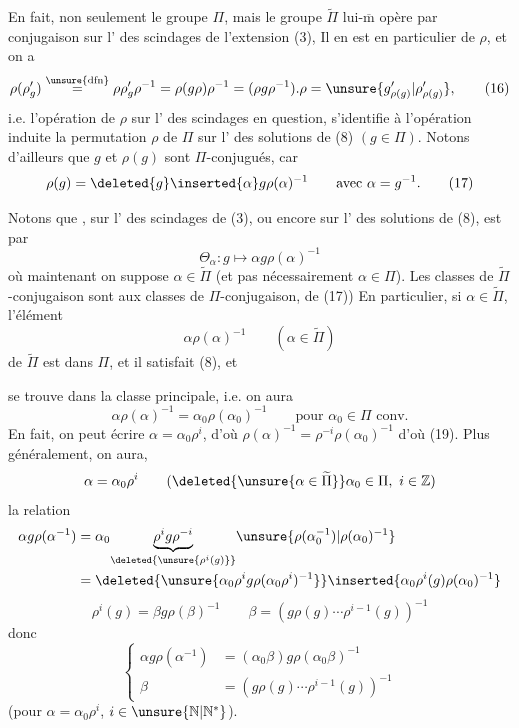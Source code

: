 En fait, non seulement le groupe $\Pi$, mais le groupe $\widetilde\Pi$ lui-$\overline{\mathrm m}$ opère par conjugaison sur l' des scindages de l'extension (3), Il en est en particulier  de $\rho$, et on a
\[
\rho(\rho'_g)\overset{\unsure{\mathrm{dfn}}}{=}
\rho\rho'_g\rho^{-1}=\rho(g\rho)\rho^{-1}
=(\rho g\rho^{-1}).\rho=\unsure{g'_{\rho(g)}|\rho'_{\rho(g)}}, \tag{16}
\]
i.e. l'opération de $\rho$ sur l' des scindages en question, s'identifie à l'opération  induite  la permutation $\rho$ de $\Pi$ sur l' des solutions de (8) $(g\in\Pi)$. Notons d'ailleurs que $g$ et $\rho(g)$  sont $\Pi$-conjugués, car
\[
\rho(g)=\deleted{g}\inserted{\alpha}g\rho(\alpha)^{-1}\qquad\text{avec }\alpha=g^{-1}. \tag{17}
\]

Notons que \deleted{\unsure{$\rho$}}, sur l' des scindages de (3), ou encore sur l' des solutions de (8), est   par
\[
\Theta_\alpha:g\longmapsto\alpha g\rho(\alpha)^{-1} \tag{10}
\]
où maintenant on suppose $\alpha\in\widetilde\Pi$ (et pas nécessairement $\alpha\in\Pi$). Les classes de $\widetilde\Pi$-conjugaison sont  aux classes de $\Pi$-conjugaison,   de (17))  En particulier, si $\alpha\in\widetilde\Pi$, l'élément
\[
\alpha\rho(\alpha)^{-1}\qquad(\alpha\in\widetilde\Pi) \tag{18}
\]
de $\widetilde\Pi$ est dans $\Pi$, et il  satisfait (8), et


se trouve dans la classe principale, i.e. on aura
\[
\alpha\rho(\alpha)^{-1}=\alpha_0\rho(\alpha_0)^{-1}\qquad\text{pour }\alpha_0\in\Pi\text{ conv.}
\]
En fait, on peut écrire $\alpha=\alpha_0\rho^i$, d'où $\rho(\alpha)^{-1}=\rho^{-i}\rho(\alpha_0)^{-1}$ d'où (19). Plus généralement, on aura, 
\[
\alpha=\alpha_0\rho^i\qquad(\deleted{\unsure{\alpha\in\widetilde\Pi}}\alpha_0\in\Pi,\ i\in\mathbb Z)
\]
la relation
\[
\begin{aligned}
\alpha g\rho(\alpha^{-1})
&=\alpha_0\underset{\deleted{\unsure{\rho^i(g)}}}{\underbrace{\rho^i g\rho^{-i}}}\unsure{\rho(\alpha_0^{-1})|\rho(\alpha_0)^{-1}}\\
&=\deleted{\unsure{\alpha_0\rho^i g\rho(\alpha_0\rho^i)^{-1}}}\inserted{\alpha_0\rho^i(g)\rho(\alpha_0)^{-1}}
\end{aligned}
\]
\[
\rho^i(g)=\beta g\rho(\beta)^{-1}\qquad
\beta=(g\rho(g)\cdots\rho^{i-1}(g))^{-1}
\]
donc
\[
\left\{\begin{aligned}
\alpha g\rho(\alpha^{-1})&=(\alpha_0\beta)g\rho(\alpha_0\beta)^{-1}\\
\beta&=(g\rho(g)\cdots\rho^{i-1}(g))^{-1}
\end{aligned}\right. \tag{19}
\]
(pour $\alpha=\alpha_0\rho^i$, $i\in\unsure{\mathbb N|\mathbb N^*}$).

